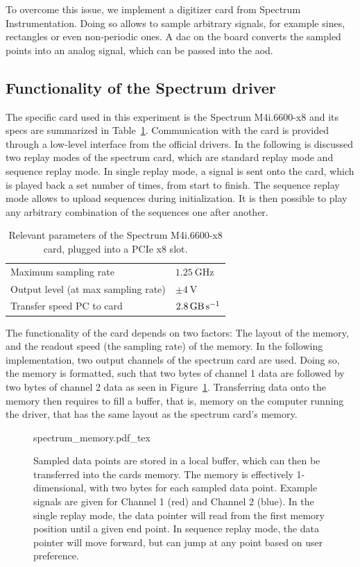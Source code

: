 To overcome this issue, we implement a digitizer card from Spectrum Instrumentation. Doing so allows to sample arbitrary signals, for example sines, rectangles or even non-periodic ones. A \ac{dac} on the board converts the sampled points into an analog signal, which can be passed into the \ac{aod}.

\subsection{Functionality of the Spectrum driver}

The specific card used in this experiment is the Spectrum M4i.6600-x8 and its specs are summarized in Table~\ref{tbl:spec_m4i}. Communication with the card is provided through a low-level interface from the official drivers. In the following is discussed two replay modes of the spectrum card, which are standard replay mode and sequence replay mode. In single replay mode, a signal is sent onto the card, which is played back a set number of times, from start to finish. The sequence replay mode allows to upload sequences during initialization. It is then possible to play any arbitrary combination of the sequences one after another.

\begin{table}[bt]
\label{tbl:spec_m4i}
\centering
\begin{tabular}{l|l}
	\hline \hline
	Maximum sampling rate & $\SI{1.25}{\giga\hertz}$ \\
	Output level (at max sampling rate) & $\pm \SI{4}{\volt}$ \\
	Transfer speed PC to card & $\SI{2.8}{\giga\byte\per\second}$ \\
	\hline \hline
\end{tabular}
\caption{Relevant parameters of the Spectrum M4i.6600-x8 card, plugged into a PCIe x8 slot.}
\end{table}

The functionality of the card depends on two factors: The layout of the memory, and the readout speed (the sampling rate) of the memory. In the following implementation, two output channels of the spectrum card are used. Doing so, the memory is formatted, such that two bytes of channel 1 data are followed by two bytes of channel 2 data as seen in Figure~\ref{fig:spectrum_memory}. Transferring data onto the memory then requires to fill a buffer, that is, memory on the computer running the driver, that has the same layout as the spectrum card's memory.
\begin{figure}[ht]
\label{fig:spectrum_memory}
\centering
	{spectrum_memory.pdf_tex}
	\caption{Sampled data points are stored in a local buffer, which can then be transferred into the cards memory. The memory is effectively 1-dimensional, with two bytes for each sampled data point. Example signals are given for Channel 1 (red) and Channel 2 (blue). In the single replay mode, the data pointer will read from the first memory position until a given end point. In sequence replay mode, the data pointer will move forward, but can jump at any point based on user preference.}
\end{figure}

